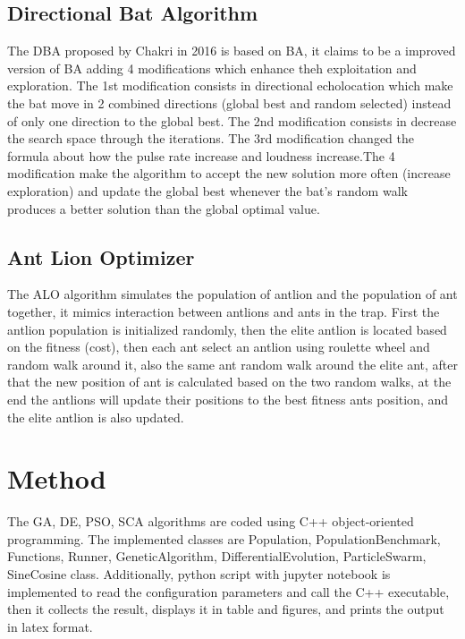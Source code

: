 \documentclass[12pt]{article}
\begin{document}
	\subsection{Directional Bat Algorithm}
	The DBA proposed by Chakri in 2016 is based on BA, it claims to be a improved version of BA adding 4 modifications which enhance theh exploitation and exploration. The 1st modification consists in directional echolocation which make the bat move in 2 combined directions (global best and random selected) instead of only one direction to the global best. The 2nd modification consists in decrease the search space through the iterations. The 3rd modification changed the formula about how the pulse rate increase and loudness increase.The 4 modification make the algorithm to accept the new solution more often (increase exploration) and update the global best whenever the bat's random walk produces a better solution than the global optimal value.

\subsection{Ant Lion Optimizer}

The ALO algorithm simulates the population of antlion and the population of ant together, it mimics interaction between antlions and ants in the trap. First the antlion population is initialized randomly, then the elite antlion is located based on the fitness (cost), then each ant select an antlion using roulette wheel and random walk around it, also the same ant random walk around the elite ant, after that the new position of ant is calculated based on the two random walks, at the end the antlions will update their positions to the best fitness ants position, and the elite antlion is also updated. 


    
    \section{Method}
    
The GA, DE, PSO, SCA algorithms are coded using C++ object-oriented programming. The implemented classes are Population, PopulationBenchmark,  Functions, Runner, GeneticAlgorithm, DifferentialEvolution, ParticleSwarm, SineCosine class. Additionally, python script with jupyter notebook is implemented to read the configuration parameters and call the C++ executable, then it collects the result, displays it in table and figures, and prints the output in latex format.
    
\end{document}
